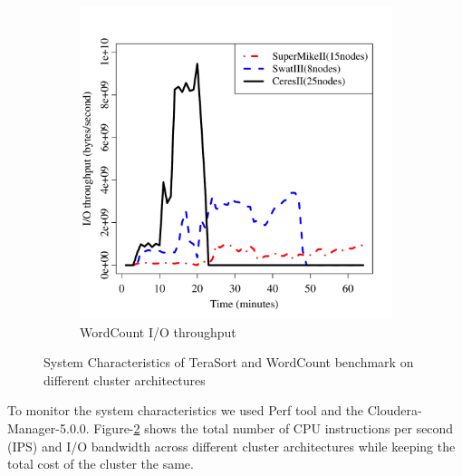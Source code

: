 \documentclass[journal]{IEEEtran}
\begin{document}
\begin{figure}[htb]
\begin{subfigure}[b]{0.24\textwidth}
                \includegraphics[width=\textwidth]{Figures/SystemFigures/WordCountIO.pdf}
                \caption{WordCount I/O throughput}
                \label{fig:WordCountIO}
   \end{subfigure}
   \caption{System Characteristics of TeraSort and WordCount benchmark on different cluster architectures}
  \label{fig:IPS}
\end{figure}
To monitor the system characteristics we used Perf tool and the Cloudera-Manager-5.0.0. Figure-\ref{fig:IPS} shows the total number of CPU instructions per second (IPS) and I/O bandwidth across different cluster architectures while keeping the total cost of the cluster the same. 
\end{document}
